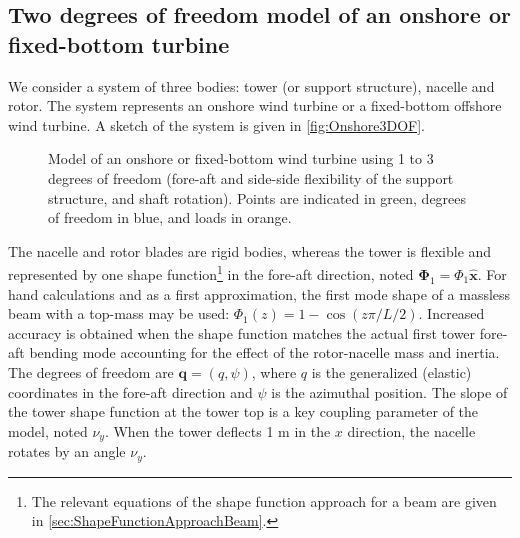 \documentclass[wes, manuscript]{copernicus}
\renewcommand{\v}[1]{\boldsymbol{#1}}
\begin{document}




\subsection{Two degrees of freedom model of an onshore or fixed-bottom turbine}
\label{sec:Onshore1DOF}\label{sec:Onshore2DOF}
We consider a system of three bodies: tower (or support structure), nacelle and rotor. The system represents an onshore wind turbine or a fixed-bottom offshore wind turbine. 
A sketch of the system is given in \autoref{fig:Onshore3DOF}. 
\begin{figure}[!htb]%
 \centering%
 \def\svgwidth{0.6\columnwidth}%
 \caption{Model of an onshore or fixed-bottom wind turbine using 1 to 3 degrees of freedom (fore-aft and side-side flexibility of the support structure, and shaft rotation). Points are indicated in green, degrees of freedom in blue, and loads in orange.}\label{fig:Onshore3DOF}%
 \end{figure}%
The nacelle and rotor blades are rigid bodies, whereas the tower is flexible and represented by one shape function\footnote{
The relevant equations of the shape function approach for a beam are given in \autoref{sec:ShapeFunctionApproachBeam}.} in the fore-aft direction, noted $\v{\Phi}_1=\Phi_1 \v{\hat{x}}$.
For hand calculations and as a first approximation, the first mode shape of a massless beam with a top-mass may be used: $\Phi_1(z)=1-\cos(z\pi/L/2)$. Increased accuracy is obtained when the shape function matches the actual first tower fore-aft bending mode accounting for the effect of the rotor-nacelle mass and inertia.
    The degrees of freedom are $\v{q}=(q, \psi)$, where $q$ is the generalized (elastic) coordinates in the fore-aft direction and $\psi$ is the azimuthal position.
The slope of the tower shape function at the tower top is a key coupling parameter of the model, noted  $\nu_y$. When the tower deflects 1 \unit{m} in the $x$ direction, the nacelle rotates by an angle $\nu_y$.
\end{document}
